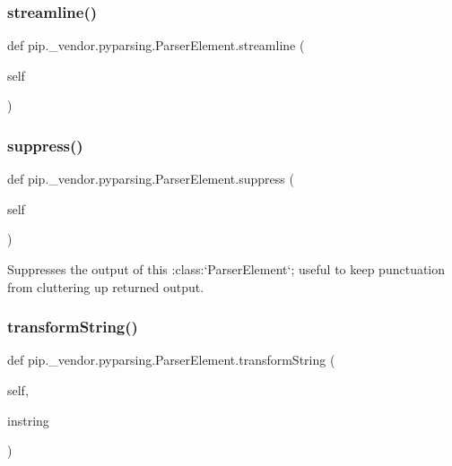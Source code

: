 \subsubsection{\texorpdfstring{streamline()}{streamline()}}
{\footnotesize\ttfamily def pip.\+\_\+vendor.\+pyparsing.\+Parser\+Element.\+streamline (\begin{DoxyParamCaption}\item[{}]{self }\end{DoxyParamCaption})}

\mbox{\label{classpip_1_1__vendor_1_1pyparsing_1_1ParserElement_a21c33a9acf5658c6f477c3c603348f14}} 
\subsubsection{\texorpdfstring{suppress()}{suppress()}}
{\footnotesize\ttfamily def pip.\+\_\+vendor.\+pyparsing.\+Parser\+Element.\+suppress (\begin{DoxyParamCaption}\item[{}]{self }\end{DoxyParamCaption})}

\begin{DoxyVerb}Suppresses the output of this :class:`ParserElement`; useful to keep punctuation from
cluttering up returned output.
\end{DoxyVerb}
 \mbox{\label{classpip_1_1__vendor_1_1pyparsing_1_1ParserElement_af2799a3c5f3d6c1375c9ebbe19df9b26}} 
\subsubsection{\texorpdfstring{transform\+String()}{transformString()}}
{\footnotesize\ttfamily def pip.\+\_\+vendor.\+pyparsing.\+Parser\+Element.\+transform\+String (\begin{DoxyParamCaption}\item[{}]{self,  }\item[{}]{instring }\end{DoxyParamCaption})}

